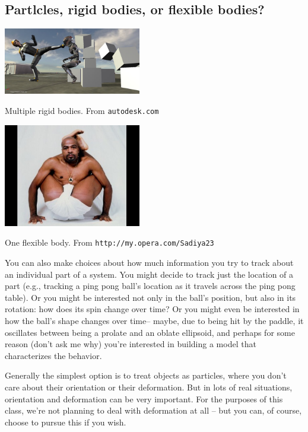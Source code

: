 \subsection{Partlcles, rigid bodies, or flexible bodies?}

\begin{marginfigure}
\includegraphics[width=6cm]{figs/rigidbodies}
\caption{Multiple rigid bodies.  From {\tt autodesk.com}
 }
\end{marginfigure}

\begin{marginfigure}
\includegraphics[width=6cm]{figs/flexiblebody}
\caption{One flexible body.  From {\tt http://my.opera.com/Sadiya23}
 }
\end{marginfigure}
You can also make choices about how much information you try to track about an individual part of a system.  You might decide to track just the location of a part (e.g., tracking a ping pong ball's location as it travels across the ping pong table).  Or you might be interested not only in the ball's position, but also in its rotation:  how does its spin change over time?  Or you might even be interested in how the ball's shape changes over time-- maybe, due to being hit by the paddle, it oscillates between being a prolate and an oblate ellipsoid, and perhaps for some reason (don't ask me why) you're interested in building a model that characterizes the behavior.

Generally the simplest option is to treat objects as particles, where you don't care about their orientation or their deformation.  But in lots of real situations, orientation and deformation can be very important.  For the purposes of this class, we're not planning to deal with deformation at all -- but you can, of course, choose to pursue this if you wish.

